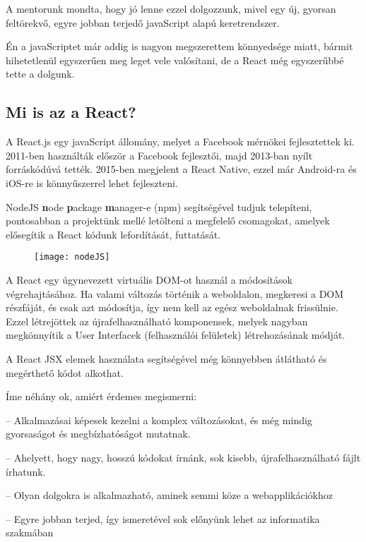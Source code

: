 A mentorunk mondta, hogy jó lenne ezzel dolgozzunk, mivel egy új, gyorsan feltörekvő, egyre jobban terjedő javaScript alapú keretrendszer. 

Én a javaScriptet már addig is nagyon megszerettem könnyedsége miatt, bármit hihetetlenül egyszerűen meg leget vele valósítani, de a React még egyszerűbbé tette a dolgunk.
\subsection{Mi is az a React?}\label{subsec:ALTALAMISMERT:react:miis}
A React.js egy javaScript állomány, melyet a Facebook mérnökei fejlesztettek ki. 2011-ben használták először a Facebook fejlesztői, majd 2013-ban nyílt forráskódúvá tették. 2015-ben megjelent a React Native, ezzel már Android-ra és iOS-re is könnyűszerrel lehet fejleszteni.

\newpage
NodeJS {\bf n}ode {\bf p}ackage {\bf m}anager-e (npm) segítségével tudjuk telepíteni, pontosabban a projektünk mellé letölteni a megfelelő csomagokat, amelyek elősegítik a React kódunk lefordítását, futtatását.
\begin{figure}[h]
	\centering
	\texttt{[image: nodeJS]}
\end{figure}

A React egy úgynevezett virtuális DOM-ot használ a módosítások végrehajtásához. Ha valami változás történik a weboldalon, megkeresi a DOM részfáját, és csak azt módosítja, így nem kell az egész weboldalnak frissülnie. Ezzel létrejöttek az újrafelhasználható komponensek, melyek nagyban megkönnyítik a User Interfacek (felhasználói felületek) létrehozásának módját.

A React JSX elemek használata segítségével még könnyebben átlátható és megérthető kódot alkothat.

Íme néhány ok, amiért érdemes megismerni:
\renewcommand{\baselinestretch}{0.98}\normalsize
\begin{description}
    \setlength{\itemsep}{0.04mm}
    \item[gyors] -- Alkalmazásai képesek kezelni a komplex változásokat, és még mindig gyorsaságot és megbízhatóságot mutatnak.
    \item[moduláris] -- Ahelyett, hogy nagy, hosszú kódokat írnánk, sok kisebb, újrafelhasználható fájlt írhatunk.
    \item[rugalmas] -- Olyan dolgokra is alkalmazható, aminek semmi köze a webapplikációkhoz
    \item[népszerű] -- Egyre jobban terjed, így ismeretével sok előnyünk lehet az informatika szakmában
\end{description}
